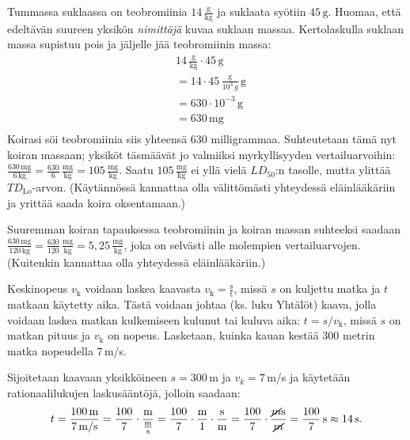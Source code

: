 \begin{esimerkki}
\begin{esimratk}
	Tummassa suklaassa on teobromiinia $14\,\frac{\text{g}}{\text{kg}}$ ja suklaata syötiin $45\,\text{g}$. Huomaa, että edeltävän suureen yksikön \textit{nimittäjä} kuvaa suklaan massaa. Kertolaskulla suklaan massa supistuu pois ja jäljelle jää teobromiinin massa:
	\begin{align*}
	& 14\,\frac{\text{g}}{\text{kg}}\cdot 45\,\text{g} \\
	&= 14\cdot 45\,\frac{\text{g}}{10^3\,g}\,\text{g} \\
	&= 630\cdot10^{-3}\,\text{g} \\
	&= 630\,\text{mg} \\
	\end{align*}
	Koirasi söi teobromiinia siis yhteensä $630$ milligrammaa. Suhteutetaan tämä nyt koiran massaan; yksiköt täsmäävät jo valmiiksi myrkyllisyyden vertailuarvoihin: $\frac{630\,\text{mg}}{6\,\text{kg}}=\frac{630}{6}\,\frac{\text{mg}}{\text{kg}}=105\,\frac{\text{mg}}{\text{kg}}$. Saatu $105\,\frac{\text{mg}}{\text{kg}}$ ei yllä vielä $LD_{50}$:n tasolle, mutta ylittää $T\!D_\text{Lo}$-arvon. (Käytännössä kannattaa olla välittömästi yhteydessä eläinlääkäriin ja yrittää saada koira oksentamaan.)
	
	Suuremman koiran tapauksessa teobromiinin ja koiran massan suhteeksi saadaan $\frac{630\,\text{mg}}{120\,\text{kg}}=\frac{630}{120}\,\frac{\text{mg}}{\text{kg}}=5,25\,\frac{\text{mg}}{\text{kg}}$, joka on selvästi alle molempien vertailuarvojen. (Kuitenkin kannattaa olla yhteydessä eläinlääkäriin.)
	\end{esimratk}
\end{esimerkki}


\begin{esimerkki}
Keskinopeus $v_\mathrm{k}$ voidaan laskea kaavasta $v_\mathrm{k}=\frac{\text{s}}{\text{t}}$, missä $s$ on kuljettu matka ja $t$ matkaan käytetty aika. Tästä voidaan johtaa (ks. luku Yhtälöt) kaava, jolla voidaan laskea matkan kulkemiseen kulunut tai kuluva aika: $t=s/v_\mathrm{k}$, missä $s$ on matkan pituus ja $v_\mathrm{k}$ on nopeus. Lasketaan, kuinka kauan kestää $300$ metrin matka nopeudella $7$\,m/s.

Sijoitetaan kaavaan yksikköineen $s=300$\,m ja $v_k= 7$\,m/s ja käytetään rationaalilukujen laskusääntöjä, jolloin saadaan:
\[t=\frac{100\,\textrm{m}}{7\,\textrm{m/s}} = \frac{100}{7} \cdot \frac{\textrm{m}}{\frac{\textrm{m}}{\textrm{s}}} 
= \frac{100}{7} \cdot \frac{\textrm{m}}{1} \cdot \frac{\textrm{s}}{\textrm{m}}
= \frac{100}{7} \cdot \frac{\cancel{m}\textrm{s}}{\cancel{m}}
=\frac{100}{7}\,\textrm{s} \approx 14\,\textrm{s}.\]
\end{esimerkki}

